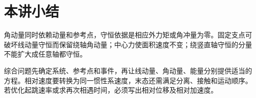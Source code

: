\section{本讲小结}
角动量同时依赖动量和参考点，守恒依据是相应外力矩或角冲量为零。固定支点可破坏线动量守恒而保留绕轴角动量；中心力使面积速度不变；绕竖直轴守恒的分量不能扩大成任意轴都守恒。

综合问题先确定系统、参考点和事件，再让线动量、角动量、能量分别提供适当的方程。相对速度要转换为同一惯性系速度，末态还需满足分离、接触和运动顺序。若优化起跳速率或求再次相遇时间，必须写出相对位移及相对加速度。
